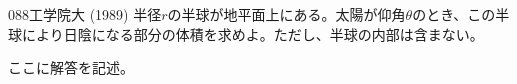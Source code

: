 \begin{prob}{088}{}{工学院大 (1989)}
 半径$r$の半球が地平面上にある。太陽が仰角$\theta$のとき、この半球により日陰になる部分の体積を求めよ。ただし、半球の内部は含まない。
\end{prob}
ここに解答を記述。